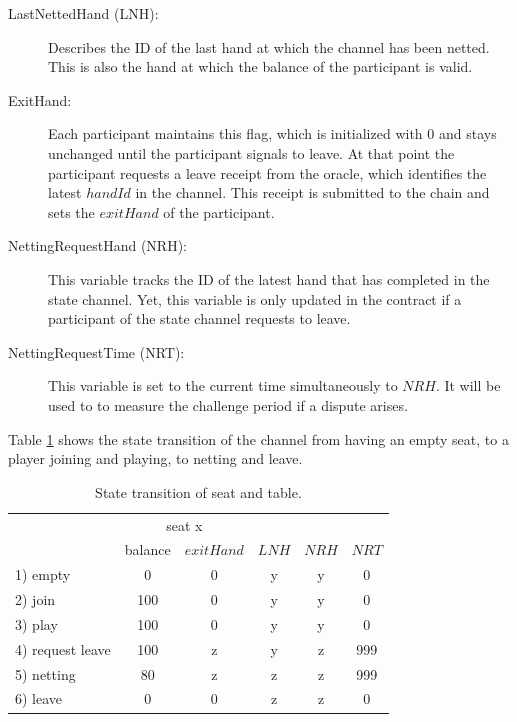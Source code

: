 \begin{description}
\item[LastNettedHand (LNH):] Describes the ID of the last hand at which the channel has been netted. This is also the hand at which the balance of the participant is valid.
\item[ExitHand:] Each participant maintains this flag, which is initialized with 0 and stays unchanged until the participant signals to leave. At that point the participant requests a leave receipt from the oracle, which identifies the latest \(handId\) in the channel. This receipt is submitted to the chain and sets the \(exitHand\) of the participant.
\item[NettingRequestHand (NRH):] This variable tracks the ID of the latest hand that has completed in the state channel. Yet, this variable is only updated in the contract if a participant of the state channel requests to leave.
\item[NettingRequestTime (NRT):] This variable is set to the current time simultaneously to \(NRH\). It will be used to to measure the challenge period if a dispute arises.
\end{description}

Table \ref{fsm-table} shows the state transition of the channel from having an empty seat, to a player joining and playing, to netting and leave. 


\begin{table}[ht]
\centering
\caption{State transition of seat and table.}
\label{fsm-table}
\begin{tabular}{lccccc}
\hline
                 & \multicolumn{2}{c}{seat x} & \multicolumn{1}{l}{} & \multicolumn{1}{l}{} & \multicolumn{1}{l}{} \\ 
                 & balance     & \(exitHand\)     & \(LNH\)                  & \(NRH\)                  & \(NRT\)                  \\ \hline
1) empty         & 0           & 0            & y                    & y                    & 0                    \\
2) join          & 100         & 0            & y                    & y                    & 0                    \\
3) play          & 100         & 0            & y                    & y                    & 0                    \\
4) request leave & 100         & z            & y                    & z                    & 999                  \\
5) netting       & 80          & z            & z                    & z                    & 999                  \\
6) leave         & 0           & 0            & z                    & z                    & 0                    \\ \hline
\end{tabular}
\end{table}

